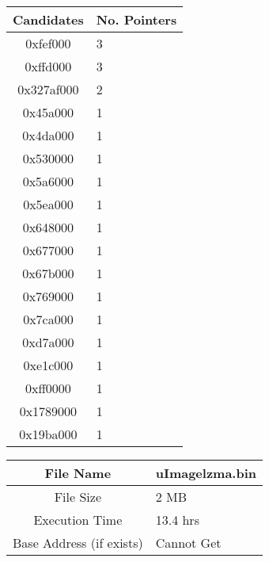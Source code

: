 \documentclass[letterpaper,twocolumn,10pt]{article}
\begin{document}
\begin{center}
    \begin{tabular}{| c | p{3cm} |}
        \hline
        Candidates & No. Pointers \\ \hline
        0xfef000 & 3\\ \hline
        0xffd000 & 3\\ \hline
        0x327af000 & 2\\ \hline
        0x45a000 & 1\\ \hline
        0x4da000 & 1\\ \hline
        0x530000 & 1\\ \hline
        0x5a6000 & 1\\ \hline
        0x5ea000 & 1\\ \hline
        0x648000 & 1\\ \hline
        0x677000 & 1\\ \hline
        0x67b000 & 1\\ \hline
        0x769000 & 1\\ \hline
        0x7ca000 & 1\\ \hline
        0xd7a000 & 1\\ \hline
        0xe1c000 & 1\\ \hline
        0xff0000 & 1\\ \hline
        0x1789000 & 1\\ \hline
        0x19ba000 & 1\\ \hline
    \end{tabular}

    \begin{tabular}{| c | p{3cm} |}
        \hline
        File Name & uImagelzma.bin\\ \hline
        File Size & 2 MB \\ \hline
        Execution Time & 13.4 hrs \\ \hline
        Base Address (if exists) & Cannot Get \\ \hline
    \end{tabular}
    

\end{center}
\end{document}
